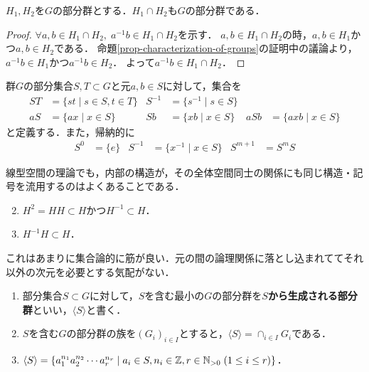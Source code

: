 \documentclass[uplatex,dvipdfmx]{jsreport}
\begin{document}
\begin{corollary}
    $H_1,H_2$を$G$の部分群とする．$H_1\cap H_2$も$G$の部分群である．
\end{corollary}
\begin{proof}
    $\forall a,b\in H_1\cap H_2,\; a^{-1}b\in H_1\cap H_2$を示す．
    $a,b\in H_1\cap H_2$の時，$a,b\in H_1$かつ$a,b\in H_2$である．
    命題\ref{prop-characterization-of-groups}の証明中の議論より，$a^{-1}b\in H_1$かつ$a^{-1}b\in H_2$．
    よって$a^{-1}b\in H_1\cap H_2$．
\end{proof}

\begin{notation}
    群$G$の部分集合$S,T\subset G$と元$a,b\in S$に対して，集合を
    \begin{align*}
        ST&=\{ st\mid s\in S,t\in T \} &S^{-1}&=\{s^{-1}\mid s\in S\}\\
        aS&=\{ax\mid x\in S\}&Sb&=\{xb\mid x\in S\}&aSb&=\{axb\mid x\in S\}
    \end{align*}
    と定義する．また，帰納的に
    \begin{align*}
        S^0&=\{e\} & S^{-1}&=\{x^{-1}\mid x\in S\} & S^{m+1}&= S^mS 
    \end{align*}
\end{notation}
\begin{remark}
    線型空間の理論でも，内部の構造が，その全体空間同士の関係にも同じ構造・記号を流用するのはよくあることである．
\end{remark}
\begin{proposition*}\mbox{}
    \begin{enumerate}\setcounter{enumi}{1}
        \item $H^2=HH\subset H$かつ$H^{-1}\subset H$．
        \item $H^{-1}H\subset H$．
    \end{enumerate}
\end{proposition*}
\begin{remark}
    これはあまりに集合論的に筋が良い．元の間の論理関係に落とし込まれててそれ以外の次元を必要とする気配がない．
\end{remark}

\begin{definition}[生成される群]\mbox{}
    \begin{enumerate}
        \item 部分集合$S\subset G$に対して，$S$を含む最小の$G$の部分群を\textbf{$S$から生成される部分群}といい，$\langle S\rangle$と書く．
        \item $S$を含む$G$の部分群の族を$(G_i)_{i\in I}$とすると，$\langle S\rangle =\cap_{i\in I}G_i$である．
        \item $\langle S\rangle = \{ a_1^{n_1}a_2^{n_2}\cdots a_r^{n_r}\mid a_i\in S, n_i\in\mathbb{Z}, r\in \mathbb{N}_{>0}\; (1\le i\le r) \}$．
    \end{enumerate}
\end{definition}
\end{document}
